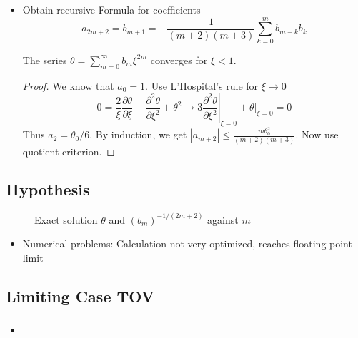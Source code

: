 \begin{frame}
	\begin{itemize}%
		\item Obtain recursive Formula for coefficients
		\begin{equation}
			a_{2m+2}=b_{m+1}= -\frac{1}{(m+2)(m+3)}\sum\limits_{k=0}^mb_{m-k}b_k
		\end{equation}
		\begin{theorem}
			The series $\theta=\sum\limits_{m=0}^\infty b_{m}\xi^{2m}$ converges for $\xi<1$. %
		\end{theorem}
		\begin{proof}
			We know that $a_0=1$. Use L'Hospital's rule for $\xi\rightarrow0$
			\begin{equation}
				0=\frac{2}{\xi}\frac{\partial\theta}{\partial\xi} + \frac{\partial^2\theta}{\partial\xi^2}+\theta^2\longrightarrow3\left.\frac{\partial^2\theta}{\partial\xi^2}\right|_{\xi=0}+\left.\theta\right|_{\xi=0}=0
			\end{equation}
			Thus $a_2=\theta_0/6$. By induction, we get $|a_{m+2}|\leq\frac{m\theta_0^2}{(m+2)(m+3)}$. Now use quotient criterion.
		\end{proof}
	\end{itemize}
\end{frame}

\subsection{Hypothesis}
\begin{frame}
	\begin{figure}
		\caption{Exact solution $\theta$ and $(b_m)^{-1/(2m+2)}$ against $m$}
	\end{figure}
	\begin{itemize}%
		\begin{theorem}
			The radius of convergence $R$ of the above calculated series is exactly the value at which $\theta(R)=0$.
		\end{theorem}
		\item Numerical problems: Calculation not very optimized, reaches floating point limit
	\end{itemize}
\end{frame}



\subsection{Limiting Case TOV}
\begin{frame}
	\frametitle{\insertsubsection}
	\begin{itemize}
		\item 
	\end{itemize}
\end{frame}

